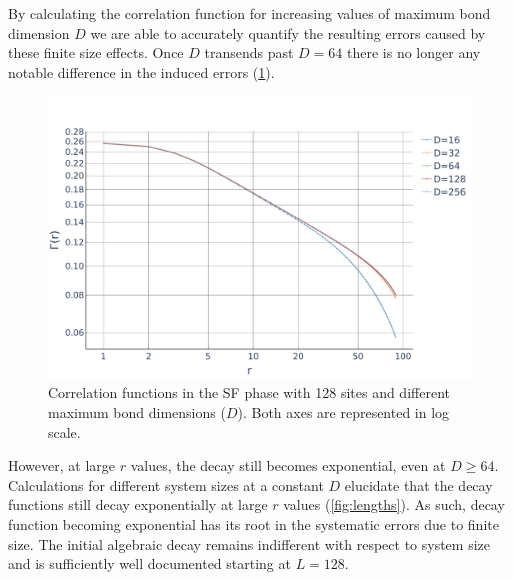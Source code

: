 \documentclass[twoside,twocolumn,9pt]{article}
\begin{document}
By calculating the correlation function for increasing values of maximum bond dimension $D$ we are able to accurately quantify the resulting errors caused by these finite size effects. Once $D$ transends past $D=64$ there is no longer any notable difference in the induced errors (\cref{fig:bonds}). 
\begin{center}
  \begin{figure}
      \includegraphics[width=\linewidth]{../code/figures/Correlations-bonds.pdf}
      \caption{Correlation functions in the SF phase with 128 sites and different maximum bond dimensions ($D$). Both axes are represented in log scale.}
      \label{fig:bonds}
  \end{figure}
\end{center}
However, at large $r$ values, the decay still becomes exponential, even at $D\ge64$. Calculations for different system sizes at a constant $D$ elucidate that the decay functions still decay exponentially at large $r$ values (\cref{fig:lengths}). As such, decay function becoming exponential has its root in the systematic errors due to finite size. The initial algebraic decay remains indifferent with respect to system size and is sufficiently well documented starting at $L=128$.
\end{document}
